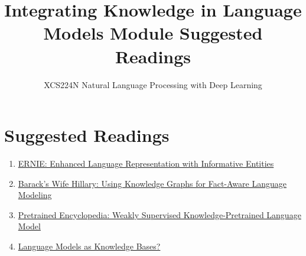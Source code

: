 \documentclass{article}
\title{Integrating Knowledge in Language Models Module Suggested Readings}
\author{XCS224N Natural Language Processing with Deep Learning}
\date{}
\begin{document}
\maketitle

\section{Suggested Readings}
\begin{enumerate}
    \item \href{https://arxiv.org/pdf/1905.07129.pdf}{ERNIE: Enhanced Language Representation with Informative Entities}
    \item \href{https://arxiv.org/pdf/1906.07241.pdf}{Barack’s Wife Hillary: Using Knowledge Graphs for Fact-Aware Language Modeling}
    \item \href{https://arxiv.org/pdf/1912.09637.pdf}{Pretrained Encyclopedia: Weakly Supervised Knowledge-Pretrained Language Model}
    \item \href{https://www.aclweb.org/anthology/D19-1250.pdf}{Language Models as Knowledge Bases?}
\end{enumerate}
\end{document}
